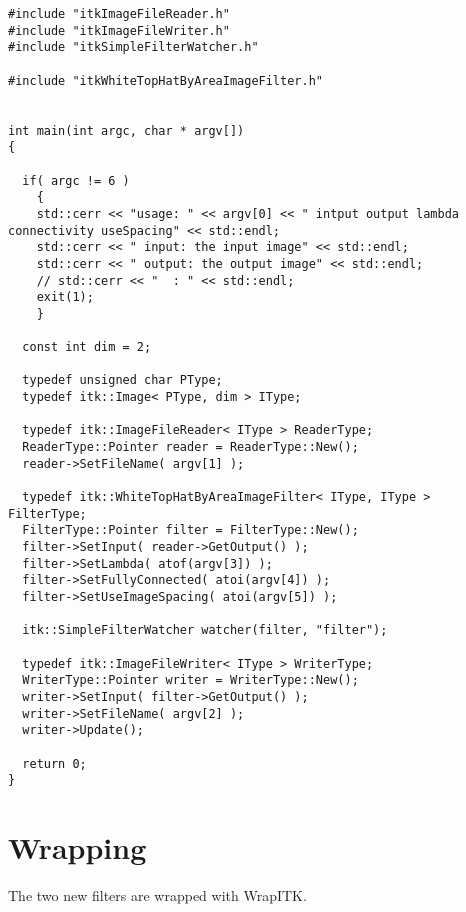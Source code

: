 \documentclass{InsightArticle}
\begin{document}
\small \begin{verbatim}
#include "itkImageFileReader.h"
#include "itkImageFileWriter.h"
#include "itkSimpleFilterWatcher.h"

#include "itkWhiteTopHatByAreaImageFilter.h"


int main(int argc, char * argv[])
{

  if( argc != 6 )
    {
    std::cerr << "usage: " << argv[0] << " intput output lambda connectivity useSpacing" << std::endl;
    std::cerr << " input: the input image" << std::endl;
    std::cerr << " output: the output image" << std::endl;
    // std::cerr << "  : " << std::endl;
    exit(1);
    }

  const int dim = 2;
  
  typedef unsigned char PType;
  typedef itk::Image< PType, dim > IType;

  typedef itk::ImageFileReader< IType > ReaderType;
  ReaderType::Pointer reader = ReaderType::New();
  reader->SetFileName( argv[1] );

  typedef itk::WhiteTopHatByAreaImageFilter< IType, IType > FilterType;
  FilterType::Pointer filter = FilterType::New();
  filter->SetInput( reader->GetOutput() );
  filter->SetLambda( atof(argv[3]) );
  filter->SetFullyConnected( atoi(argv[4]) );
  filter->SetUseImageSpacing( atoi(argv[5]) );

  itk::SimpleFilterWatcher watcher(filter, "filter");

  typedef itk::ImageFileWriter< IType > WriterType;
  WriterType::Pointer writer = WriterType::New();
  writer->SetInput( filter->GetOutput() );
  writer->SetFileName( argv[2] );
  writer->Update();

  return 0;
}
\end{verbatim} \normalsize

\section{Wrapping}

The two new filters are wrapped with WrapITK.
 
\appendix




\nocite{ITKSoftwareGuide}
\nocite{Beare2007}
\end{document}
